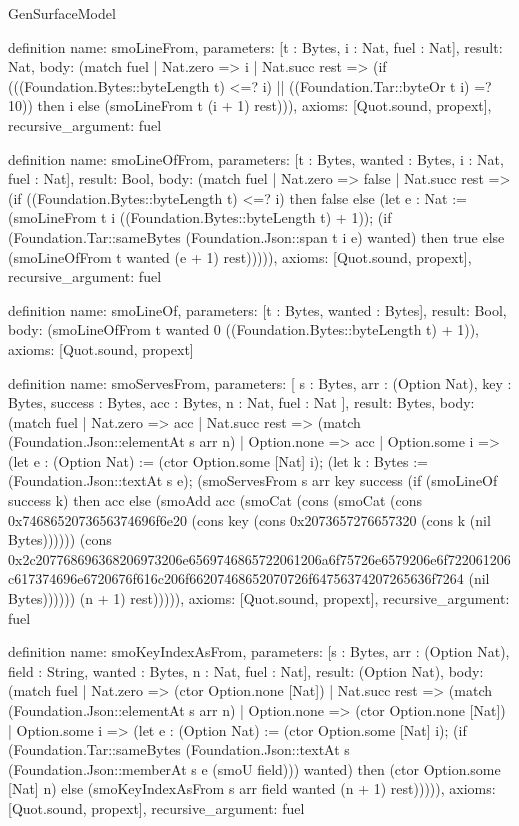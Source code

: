 \begin{lexlean}{GenSurfaceModel}
\begin{semanticmodule}
definition{
  name: smoLineFrom,
  parameters: [t : Bytes, i : Nat, fuel : Nat],
  result: Nat,
  body: (match fuel
    | Nat.zero => i
    | Nat.succ rest => (if (((Foundation.Bytes::byteLength t) <=? i) || ((Foundation.Tar::byteOr t i) =? 10)) then i else (smoLineFrom t (i + 1) rest))),
  axioms: [Quot.sound, propext],
  recursive_argument: fuel
}

definition{
  name: smoLineOfFrom,
  parameters: [t : Bytes, wanted : Bytes, i : Nat, fuel : Nat],
  result: Bool,
  body: (match fuel
    | Nat.zero => false
    | Nat.succ rest => (if ((Foundation.Bytes::byteLength t) <=? i) then false else (let e : Nat := (smoLineFrom t i ((Foundation.Bytes::byteLength t) + 1)); (if (Foundation.Tar::sameBytes (Foundation.Json::span t i e) wanted) then true else (smoLineOfFrom t wanted (e + 1) rest))))),
  axioms: [Quot.sound, propext],
  recursive_argument: fuel
}

definition{
  name: smoLineOf,
  parameters: [t : Bytes, wanted : Bytes],
  result: Bool,
  body: (smoLineOfFrom t wanted 0 ((Foundation.Bytes::byteLength t) + 1)),
  axioms: [Quot.sound, propext]
}

definition{
  name: smoServesFrom,
  parameters: [
    s : Bytes,
    arr : (Option Nat),
    key : Bytes,
    success : Bytes,
    acc : Bytes,
    n : Nat,
    fuel : Nat
  ],
  result: Bytes,
  body: (match fuel
    | Nat.zero => acc
    | Nat.succ rest => (match (Foundation.Json::elementAt s arr n)
      | Option.none => acc
      | Option.some i => (let e : (Option Nat) := (ctor Option.some [Nat] i); (let k : Bytes := (Foundation.Json::textAt s e); (smoServesFrom s arr key success (if (smoLineOf success k) then acc else (smoAdd acc (smoCat (cons (smoCat (cons 0x7468652073656374696f6e20 (cons key (cons 0x2073657276657320 (cons k (nil Bytes)))))) (cons 0x2c207768696368206973206e6569746865722061206a6f75726e6579206e6f722061206c617374696e6720676f616c206f66207468652070726f64756374207265636f7264 (nil Bytes)))))) (n + 1) rest))))),
  axioms: [Quot.sound, propext],
  recursive_argument: fuel
}

definition{
  name: smoKeyIndexAsFrom,
  parameters: [s : Bytes, arr : (Option Nat), field : String, wanted : Bytes, n : Nat, fuel : Nat],
  result: (Option Nat),
  body: (match fuel
    | Nat.zero => (ctor Option.none [Nat])
    | Nat.succ rest => (match (Foundation.Json::elementAt s arr n)
      | Option.none => (ctor Option.none [Nat])
      | Option.some i => (let e : (Option Nat) := (ctor Option.some [Nat] i); (if (Foundation.Tar::sameBytes (Foundation.Json::textAt s (Foundation.Json::memberAt s e (smoU field))) wanted) then (ctor Option.some [Nat] n) else (smoKeyIndexAsFrom s arr field wanted (n + 1) rest))))),
  axioms: [Quot.sound, propext],
  recursive_argument: fuel
}


\end{semanticmodule}
\end{lexlean}
